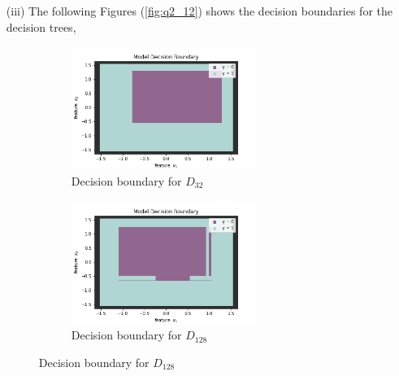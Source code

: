 \documentclass[a4paper]{article}
\theoremstyle{definition}
\newenvironment{soln}{
    \leavevmode\color{blue}\ignorespaces
}{}
\begin{document}
\begin{soln}
\begin{itemize}
      \item [(iii)] The following Figures (\ref{fig:q2_12}) shows the decision boundaries for the decision trees,
        \begin{figure}[H]
          \centering
          \begin{subfigure}[b]{0.3\textwidth}
              \centering
              \includegraphics[width=6cm]{D32_trn_decision_boundary.png}
              \caption{Decision boundary for $D_{32}$}
              \label{fig:d32_vis}
          \end{subfigure}
          \begin{subfigure}[b]{0.3\textwidth}
              \centering
              \includegraphics[width=6cm]{D128_trn_decision_boundary.png}
              \caption{Decision boundary for $D_{128}$}
              \label{fig:d128_vis}
          \end{subfigure}
          \label{fig:q2_10}
      \end{figure}



\end{itemize}
\end{soln}
\end{document}
